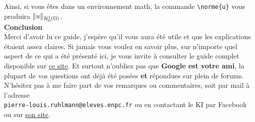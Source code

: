 \documentclass[11pt]{article}				%
\newcommand{\cmd}[2]{\texttt{\textbackslash #1}\texttt{\{#2\}}}
\begin{document}
Ainsi, si vous êtes dans un environnement math, la commande \cmd{norme}{u} vous produira $\|u\|_{\mathcal{H}^1_0\left(\Omega\right)}$.\\

\textbf{Conclusion}\\

Merci d'avoir lu ce guide, j'espère qu'il vous aura été utile et que les explications étaient assez claires. Si jamais vous voulez en savoir plus, sur n'importe quel aspect de ce qui a été présenté ici, je vous invite à consulter le guide complet disponible sur \href{http://latex.enpc.org}{ce site}. Et surtout n'oubliez pas que \textbf{Google est votre ami}, la plupart de vos questions ont déjà été posées \textbf{et} répondues sur plein de forums.\\

N'hésitez pas à me faire part de vos remarques ou commentaires, soit par mail à l'adresse \\ \texttt{pierre-louis.ruhlmann@eleves.enpc.fr} ou en contactant le KI par Facebook ou sur \href{http://clubinfo.enpc.org}{son site}.\\
\end{document}
